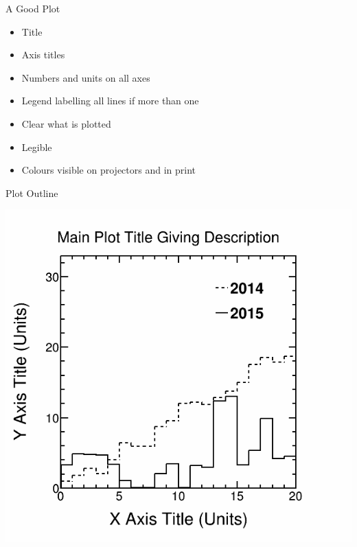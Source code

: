 \documentclass{beamer}
\begin{document}
\begin{frame}{A Good Plot}

\begin{itemize}
\item Title
\item Axis titles
\item Numbers and units on all axes
\item Legend labelling all lines if more than one
\item Clear what is plotted
\item Legible
\item Colours visible on projectors and in print
\end{itemize}

\end{frame}


\begin{frame}{Plot Outline}
\begin{center}
\includegraphics[scale=0.35]{pics/goodplot.png}
\end{center}
\end{frame}
\end{document}
